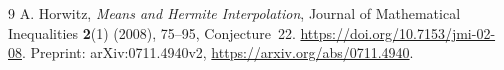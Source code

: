\documentclass[11pt]{article}
\begin{document}
\begin{thebibliography}{9}
 A. Horwitz, \emph{Means and Hermite Interpolation},
Journal of Mathematical Inequalities \textbf{2}(1) (2008), 75--95,
Conjecture~22. \url{https://doi.org/10.7153/jmi-02-08}.
Preprint: arXiv:0711.4940v2,
\url{https://arxiv.org/abs/0711.4940}.
\end{thebibliography}
\end{document}
